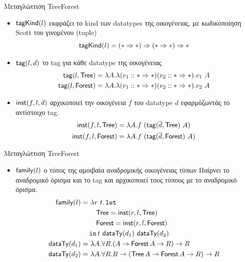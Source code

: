 \documentclass[10pt]{beamer}
\begin{document}
\begin{frame}{Μεταγλώττιση TreeForest}

\begin{itemize}[<+->]
  \item $\mathsf{tagKind}(l)$ εκφράζει το kind των datatypes της οικογένειας,
  με κωδικοποίηση Scott του γινομένου (tuple)
    $$\mathsf{tagKind}(l) = (\operatorname{\ast} \Rightarrow \operatorname{\ast}) \Rightarrow (\operatorname{\ast} \Rightarrow \operatorname{\ast}) \Rightarrow \operatorname{\ast}$$
  \item $\mathsf{tag}(l, d)$ το tag για κάθε datatype της οικογένειας
    \begin{align*}
    \mathsf{tag}(l, \operatorname{\textsf{Tree}}) &= \lambda A . \lambda (v_1 :: \operatorname{\ast} \Rightarrow \operatorname{\ast}) (v_2 :: \operatorname{\ast} \Rightarrow \operatorname{\ast}) . v_1\ A\\
    \mathsf{tag}(l, \operatorname{\textsf{Forest}}) &= \lambda A . \lambda (v_1 :: \operatorname{\ast} \Rightarrow \operatorname{\ast}) (v_2 :: \operatorname{\ast} \Rightarrow \operatorname{\ast}) . v_2\ A
    \end{align*}
  \item $\mathsf{inst}(f, l, d)$ αρχικοποιεί την οικογένεια $f$ του
    datatype $d$ εφαρμόζωντάς το αντίστοιχο tag.
    \begin{align*}
    \dtInst{f}{l}{\Tree} &= \lambda A . f\ (\dtTag{\seq{d}}{\Tree}\ A)\\
    \dtInst{f}{l}{\Forest} &= \lambda A . f\ (\dtTag{\seq{d}}{\Forest}\ A)
    \end{align*}
\end{itemize}
\end{frame}

\begin{frame}{Μεταγλώττιση TreeForest}

\begin{itemize}
 \item $\mathsf{family}(l)$ ο τύπος της αμοιβαία αναδρομικής οικογένειας τύπων
 Παίρνει το αναδρομικό όρισμα και το tag και αρχικοποιεί τους τύπους με το
 αναδρομικό όρισμα.
    \begin{align*}
    \mathsf{family}(l) =&\ \lambda r\ t . \operatorname{\texttt{let}} \\
        &\quad\operatorname{\textsf{Tree}} = \mathsf{inst}(r, l, \operatorname{\textsf{Tree}})\\
        &\quad\operatorname{\textsf{Forest}} = \mathsf{inst}(r, l, \operatorname{\textsf{Forest}})\\
      &\operatorname{\texttt{in}} t\ \mathsf{dataTy}(d_1)\ \mathsf{dataTy}(d_2)\\
    \mathsf{dataTy}(d_1) =&\ \lambda A . \forall R . (A \rightarrow \operatorname{\textsf{Forest}} A \rightarrow R) \rightarrow R\\
    \mathsf{dataTy}(d_2) =&\ \lambda A . \forall R . R \rightarrow (\operatorname{\textsf{Tree}} A \rightarrow \operatorname{\textsf{Forest}} A \rightarrow R) \rightarrow R
    \end{align*}
    \end{itemize}
\end{frame}
\end{document}
